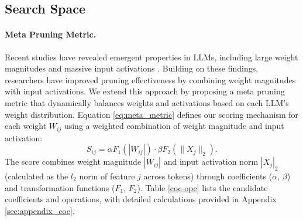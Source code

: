 
\subsection{Search Space}
\label{sec:search space}
\paragraph{Meta Pruning Metric.}
Recent studies have revealed emergent properties in LLMs, including large weight magnitudes \citep{puccetti2022outliers, wei2022outlier, dettmers2022gpt3} and massive input activations \citep{sun2024massive}. Building on these findings, researchers \citep{sun2023simple, zhangplug} have improved pruning effectiveness by combining weight magnitudes with input activations. We extend this approach by proposing a meta pruning metric that dynamically balances weights and activations based on each LLM's weight distribution.
Equation \ref{eq:meta_metric} defines our scoring mechanism for each weight $W_{ij}$ using a weighted combination of weight magnitude and input activation:
\begin{equation}
    S_{ij} = \alpha F_{1} (|W_{ij}|) \cdot \beta F_{2} (\|X_{j}\|_{2}).
\label{eq:meta_metric}
\end{equation}
The score combines weight magnitude $|W_{ij}|$ and input activation norm $|X_{j}|_{2}$ (calculated as the $l_2$ norm of feature $j$ across tokens) through coefficients ($\alpha$, $\beta$) and transformation functions ($F_1$, $F_2$). Table \ref{coe-ope} lists the candidate coefficients and operations, with detailed calculations provided in Appendix \ref{sec:appendix_coe}.


